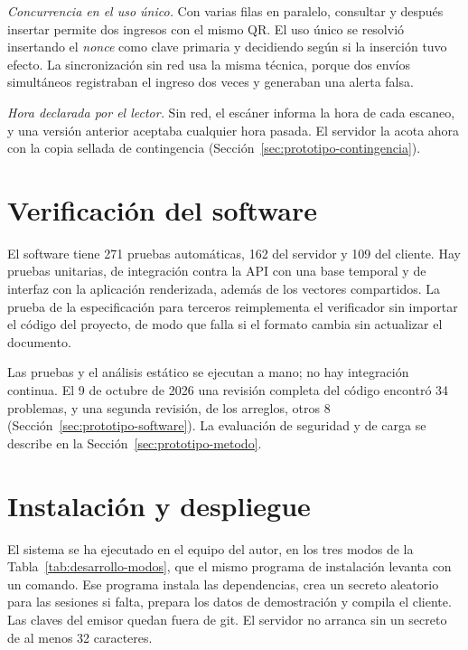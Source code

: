 \emph{Concurrencia en el uso único.} Con varias filas en paralelo, consultar y después insertar permite dos
ingresos con el mismo QR. El uso único se resolvió insertando el \textit{nonce} como clave primaria y decidiendo
según si la inserción tuvo efecto. La sincronización sin red usa la misma técnica, porque dos envíos simultáneos
registraban el ingreso dos veces y generaban una alerta falsa.

\emph{Hora declarada por el lector.} Sin red, el escáner informa la hora de cada escaneo, y una versión anterior
aceptaba cualquier hora pasada. El servidor la acota ahora con la copia sellada de contingencia
(Sección~\ref{sec:prototipo-contingencia}).

\section{Verificación del software}
\label{sec:desarrollo-verificacion}

El software tiene 271 pruebas automáticas, 162 del servidor y 109 del cliente.
Hay pruebas unitarias, de integración contra la API con una base temporal y de interfaz con la aplicación
renderizada, además de los vectores compartidos.
La prueba de la especificación para terceros reimplementa el verificador sin importar el código del proyecto, de
modo que falla si el formato cambia sin actualizar el documento.

Las pruebas y el análisis estático se ejecutan a mano; no hay integración continua. El 9 de octubre de 2026 una
revisión completa del código encontró 34 problemas, y una segunda revisión, de los arreglos, otros 8
(Sección~\ref{sec:prototipo-software}). La evaluación de seguridad y de carga se describe en la
Sección~\ref{sec:prototipo-metodo}.

\section{Instalación y despliegue}
\label{sec:desarrollo-despliegue}

El sistema se ha ejecutado en el equipo del autor, en los tres modos de la
Tabla~\ref{tab:desarrollo-modos}, que el mismo programa de instalación levanta con un comando. Ese programa instala
las dependencias, crea un secreto aleatorio para las sesiones si falta, prepara los datos de demostración y
compila el cliente. Las claves del emisor quedan fuera de git. El servidor no arranca sin un secreto de al menos 32
caracteres.

